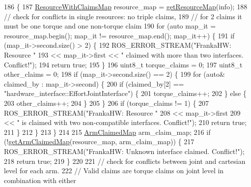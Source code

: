 \begin{DoxyCode}
186                                                                                            \{
187   \hyperlink{namespacefranka__hw_a1fae0c56c9a08fdeb137e601f876cc77}{ResourceWithClaimsMap} resource\_map = \hyperlink{namespacefranka__hw_a6c621829dd30c8ff939de6ae0861966d}{getResourceMap}(info);
188   \textcolor{comment}{// check for conflicts in single resources: no triple claims,}
189   \textcolor{comment}{// for 2 claims it must be one torque and one non-torque claim}
190   \textcolor{keywordflow}{for} (\textcolor{keyword}{auto} map\_it = resource\_map.begin(); map\_it != resource\_map.end(); map\_it++) \{
191     \textcolor{keywordflow}{if} (map\_it->second.size() > 2) \{
192       ROS\_ERROR\_STREAM(\textcolor{stringliteral}{"FrankaHW: Resource "}
193                        << map\_it->first << \textcolor{stringliteral}{" claimed with more than two interfaces. Conflict!"});
194       \textcolor{keywordflow}{return} \textcolor{keyword}{true};
195     \}
196     uint8\_t torque\_claims = 0;
197     uint8\_t other\_claims = 0;
198     \textcolor{keywordflow}{if} (map\_it->second.size() == 2) \{
199       \textcolor{keywordflow}{for} (\textcolor{keyword}{auto}& claimed\_by : map\_it->second) \{
200         \textcolor{keywordflow}{if} (claimed\_by[2] == \textcolor{stringliteral}{"hardware\_interface::EffortJointInterface"}) \{
201           torque\_claims++;
202         \} \textcolor{keywordflow}{else} \{
203           other\_claims++;
204         \}
205       \}
206       \textcolor{keywordflow}{if} (torque\_claims != 1) \{
207         ROS\_ERROR\_STREAM(\textcolor{stringliteral}{"FrankaHW: Resource "}
208                          << map\_it->first
209                          << \textcolor{stringliteral}{" is claimed with two non-compatible interfaces. Conflict!"});
210         \textcolor{keywordflow}{return} \textcolor{keyword}{true};
211       \}
212     \}
213   \}
214 
215   \hyperlink{namespacefranka__hw_a9b9c672b3e064953e816024fc2f9cf0f}{ArmClaimedMap} arm\_claim\_map;
216   \textcolor{keywordflow}{if} (!\hyperlink{namespacefranka__hw_af08f089686416ffb7904fbe86f19b8a9}{getArmClaimedMap}(resource\_map, arm\_claim\_map)) \{
217     ROS\_ERROR\_STREAM(\textcolor{stringliteral}{"FrankaHW: Unknown interface claimed. Conflict!"});
218     \textcolor{keywordflow}{return} \textcolor{keyword}{true};
219   \}
220 
221   \textcolor{comment}{// check for conflicts between joint and cartesian level for each arm.}
222   \textcolor{comment}{// Valid claims are torque claims on joint level in combination with either}

\end{DoxyCode}
